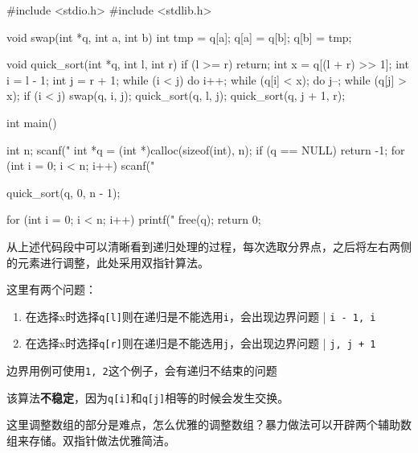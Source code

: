 \begin{mycpptwocol}
    #include <stdio.h>
    #include <stdlib.h>

    void swap(int *q, int a, int b) {
        int tmp = q[a];
        q[a] = q[b];
        q[b] = tmp;
    }

    void quick_sort(int *q, int l, int r) {
        if (l >= r) {
            return;
        }
        int x = q[(l + r) >> 1];
        int i = l - 1;
        int j = r + 1;
        while (i < j) {
            do i++; while (q[i] < x);
            do j--; while (q[j] > x);
            if (i < j) {
                swap(q, i, j);
            }
        }
        quick_sort(q, l, j);
        quick_sort(q, j + 1, r);
    }

    int main() {
        int n;
        scanf("%
        int *q = (int *)calloc(sizeof(int), n);
        if (q == NULL) {
            return -1;
        }
        for (int i = 0; i < n; i++) {
            scanf("%
        }

        quick_sort(q, 0, n - 1);

        for (int i = 0; i < n; i++) {
            printf("%
        }
        free(q);
        return 0;
    }
\end{mycpptwocol}

从上述代码段中可以清晰看到递归处理的过程，每次选取分界点，之后将左右两侧的元素进行调整，此处采用双指针算法。

\begin{keypoint}
    这里有两个问题：
    \begin{enumerate}
        \item 在选择x时选择\lstinline{q[l]}则在递归是不能选用\lstinline{i}，会出现边界问题 | \lstinline{i - 1, i}
        \item 在选择x时选择\lstinline{q[r]}则在递归是不能选用\lstinline{j}，会出现边界问题 | \lstinline{j, j + 1}
    \end{enumerate}

    边界用例可使用\lstinline{1, 2}这个例子，会有递归不结束的问题
\end{keypoint}

\begin{information}
    该算法\textbf{不稳定}，因为\lstinline{q[i]}和\lstinline{q[j]}相等的时候会发生交换。

    这里调整数组的部分是难点，怎么优雅的调整数组？暴力做法可以开辟两个辅助数组来存储。双指针做法优雅简洁。
\end{information}

